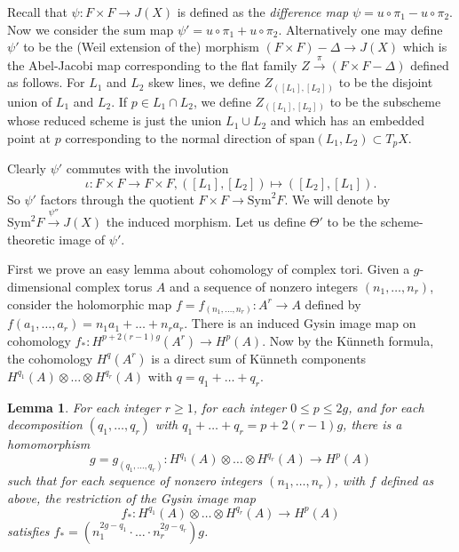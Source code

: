 \documentclass[amssymb,twoside,12 pt,amscd,reqno]{amsart}
\theoremstyle{plain}
\newtheorem{lem}[thm]{Lemma}
\theoremstyle{definition}
\def\ps{\vspace{4pt}}
\newcommand{\lt}{\left}
\newcommand{\rt}{\right}
\begin{document}
Recall that $\psi:F\times F\rightarrow J(X)$ is defined as the
\emph{difference map} $\psi = u\circ \pi_1-u\circ \pi_2$.  Now we
consider the sum map $\psi'=u\circ\pi_1+u\circ\pi_2$.  
Alternatively one may define $\psi'$ to be the (Weil extension of the)
morphism $(F\times F)-\Delta \rightarrow J(X)$ which is the
Abel-Jacobi map corresponding to the flat family $Z\xrightarrow{\pi}
(F\times F-\Delta)$ defined as follows.  For $L_1$ and $L_2$ skew
lines, we define $Z_{\lt([L_1],[L_2]\rt)}$ to be the disjoint union of
$L_1$ and $L_2$.  If $p\in L_1\cap L_2$, we define
$Z_{\lt([L_1],[L_2]\rt)}$ to be the subscheme whose reduced scheme is
just the union $L_1\cup L_2$ and which has an embedded point at $p$
corresponding to the normal direction of $\text{span}(L_1,L_2)\subset
T_p X$.

\ps

Clearly $\psi'$ commutes with the involution 
\begin{equation}
\iota:F\times F \rightarrow F\times F, ([L_1],[L_2])\mapsto
([L_2],[L_1]). 
\end{equation}
So $\psi'$ factors through the
quotient $F\times F\rightarrow \text{Sym}^2 F$.  We will denote by
$\text{Sym}^2 F
\xrightarrow{\psi''} J(X)$ the induced morphism.
Let us define $\Theta'$ to be the scheme-theoretic image of $\psi'$.

\ps

First we prove an easy lemma about
cohomology of complex tori.  Given a $g$-dimensional complex torus $A$
and a sequence of nonzero integers $(n_1,\dots,n_r)$, consider the
holomorphic map $f=f_{(n_1,\dots,n_r)}:A^r\rightarrow A$ defined by
$f(a_1,\dots,a_r) = n_1a_1 + \dots + n_r a_r$.  There is an induced
Gysin image map on cohomology $f_*:H^{p+2(r-1)g}(A^r)\rightarrow
H^p(A)$.  Now by the K\"unneth formula, the cohomology $H^q(A^r)$ is a
direct sum of K\"unneth components $H^{q_1}(A)\otimes \dots \otimes
H^{q_r}(A)$ with $q=q_1+\dots+q_r$.

\begin{lem}\label{lem-cohom}  For each integer $r\geq 1$, for each
integer $0\leq p\leq 2g$, and for each decomposition $(q_1,\dots,q_r)$
with $q_1+\dots+q_r = p + 2(r-1)g$, there is a homomorphism
\begin{equation}
g=g_{(q_1,\dots,q_r)}:H^{q_1}(A)\otimes\dots\otimes
H^{q_r}(A)\rightarrow H^p(A)
\end{equation}
such that for each sequence of nonzero integers $(n_1,\dots,n_r)$,
with $f$ defined as above, the restriction of the Gysin image map
\begin{equation}
f_*:H^{q_1}(A)\otimes \dots\otimes H^{q_r}(A)\rightarrow H^p(A)
\end{equation}
satisfies $f_* = \lt(n_1^{2g-q_1}\cdot \dots \cdot n_r^{2g-q_r}\rt) g$.  
\end{lem}
\end{document}
